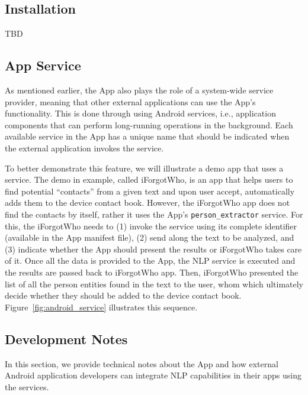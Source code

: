 \subsection{Installation}
TBD

\subsection{\sa App Service}
\label{sec:android_service}
As mentioned earlier, the \sa App also plays the role of a system-wide service provider, meaning that other external applications can use the \sa App's functionality. This is done through using Android services, i.e., application components that can perform long-running operations in the background. Each available service in the \sa App has a unique name that should be indicated when the external application invokes the service.

To better demonstrate this feature, we will illustrate a demo app that uses a \sa service. The demo in example, called iForgotWho, is an app that helps users to find potential ``contacts'' from a given text and upon user accept, automatically adds them to the device contact book. However, the iForgotWho app does not find the contacts by itself, rather it uses the \sa App's \texttt{person\_extractor} service. For this, the iForgotWho needs to (1) invoke the service using its complete identifier (available in the \sa App manifest file), (2) send along the text to be analyzed, and (3) indicate whether the \sa App should present the results or iForgotWho takes care of it. Once all the data is provided to the \sa App, the NLP service is executed and the results are passed back to iForgotWho app. Then, iForgotWho presented the list of all the person entities found in the text to the user, whom which ultimately decide whether they should be added to the device contact book. Figure~\ref{fig:android_service} illustrates this sequence.

\subsection{Development Notes}
In this section, we provide technical notes about the \sa App and how external Android application developers can integrate NLP capabilities in their apps using the \sa services.

